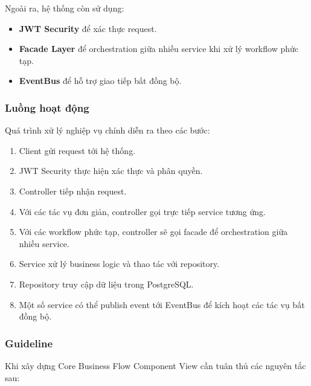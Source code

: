 Ngoài ra, hệ thống còn sử dụng:
\begin{itemize}
    \item \textbf{JWT Security} để xác thực request.
    \item \textbf{Facade Layer} để orchestration giữa nhiều service khi xử lý workflow phức tạp.
    \item \textbf{EventBus} để hỗ trợ giao tiếp bất đồng bộ.
\end{itemize}

\subsubsection*{Luồng hoạt động}

Quá trình xử lý nghiệp vụ chính diễn ra theo các bước:

\begin{enumerate}
    \item Client gửi request tới hệ thống.
    
    \item JWT Security thực hiện xác thực và phân quyền.
    
    \item Controller tiếp nhận request.
    
    \item Với các tác vụ đơn giản, controller gọi trực tiếp service tương ứng.
    
    \item Với các workflow phức tạp, controller sẽ gọi facade để orchestration giữa nhiều service.
    
    \item Service xử lý business logic và thao tác với repository.
    
    \item Repository truy cập dữ liệu trong PostgreSQL.
    
    \item Một số service có thể publish event tới EventBus để kích hoạt các tác vụ bất đồng bộ.
\end{enumerate}

\subsubsection*{Guideline}

Khi xây dựng Core Business Flow Component View cần tuân thủ các nguyên tắc sau:

